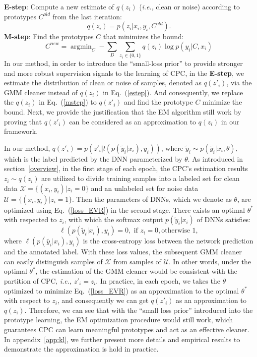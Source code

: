 \documentclass{article} \usepackage{iclr2023_conference,times}
\begin{document}
\textbf{E-step}: Compute a new estimate of $q(z_i)$ (\emph{i.e.,} clean or noise) according to prototypes $C^{old}$ from the last iteration:
    \begin{equation} \label{estep}
        q(z_i) = p(z_i|x_i,y_i,C^{old}).
    \end{equation}
\textbf{M-step}: Find the prototypes $C$ that minimizes the bound:
    \begin{equation} \label{mstep}
        C^{new} =  \mathop{\arg\min}_{C} -   \sum_{ D} \sum_{z_i \in \{0,1\}} q(z_i) \log   p(y_i|C,x_i)
    \end{equation}
In our method, in order to introduce the ``small-loss prior'' to provide stronger and more robust supervision signals to the learning of CPC, in the \textbf{E-step}, we estimate the distribution of clean or noise of samples, denoted as $q(z'_i)$, via the GMM cleaner instead of $q(z_i)$ in Eq.~(\ref{estep}). And consequently, we replace the $q(z_i)$ in  Eq.~(\ref{mstep}) to $q(z'_i)$ and find the prototype $C$ minimize the bound. Next, we provide the justification that the EM algorithm still work by proving that $q(z'_i)$ can be considered as an approximation to $q(z_i)$ in our framework.



In our method, $q (z'_i)=p(z'_i|l(p(\tilde{y}_{i}|x_{i}), y_i))$, where $\tilde{y}_i \sim p(\tilde{ y_{i}}|x_{i},\theta)$, 
which is the label predicted by the DNN parameterized by $\theta$.
As introduced in section~\ref{overview}, in the first stage of each epoch, the CPC's estimation results $z_i \sim q(z_i)$ are utilized to divide training samples into a labeled set for clean  data $\mathcal{X}=\{(x_i,y_i) | z_i = 0\}$ and an unlabeled set for noise data $\mathcal{U}=\{(x_i,y_i) | z_i = 1\}$.
Then the parameters of DNNs, which we denote as $\theta$, are optimized using Eq.~(\ref{loss_EVR}) in the second stage.
There exists an optimal $\theta^*$ with respected to $z_i$, with which the softmax output $p(\tilde{y}_i|x_i)$ of DNNs satisfies:
\begin{equation}
    \ell(p(\tilde{y}_{i}|x_{i}), y_i) =  0, \text{ if } z_i=0, \text {otherwise } 1,
\end{equation}
where $\ell(p(\tilde{y_i}|x_i), y_i)$ is the cross-entropy loss between the network prediction and the annotated label.
With these loss values,
the subsequent GMM cleaner can easily distinguish samples of $\mathcal{X}$ from samples of $\mathcal{U}$.
In other words,
under the optimal $\theta^*$,
the estimation of the GMM cleaner would be consistent with the partition of CPC, \emph{i.e.,} $z'_i = z_i$. In practice, in each epoch, we takes the $\theta$ optimized to minimize Eq.~(\ref{loss_EVR}) as an approximation to the optimal $\theta^*$ with respect to $z_i$, and consequently we can get $q(z'_i)$ as an approximation to $q(z_i)$. Therefore, we can see that with the ``small loss prior'' introduced into the prototype learning, the EM optimization procedure would still work, which guarantees CPC can learn meaningful prototypes and act as an effective cleaner.
In appendix~\ref{app:kl}, we further present more details and empirical results to demonstrate the approximation is hold in practice. 
\end{document}

